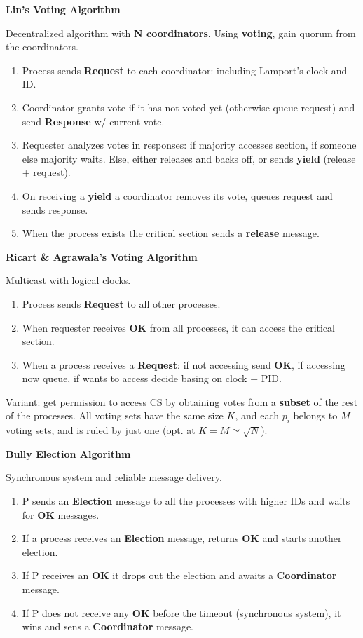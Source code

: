 \documentclass[a4paper, 10pt, twocolumn]{article}
\begin{document}
    \textbf{Lin's Voting Algorithm}
    
    Decentralized algorithm with \textbf{N coordinators}.
    Using \textbf{voting}, gain quorum from the coordinators.
    \begin{enumerate}
        \item Process sends \textbf{Request} to each coordinator: including Lamport's clock and ID.
        \item Coordinator grants vote if it has not voted yet (otherwise queue request) and send \textbf{Response} w/ current vote.
        \item Requester analyzes votes in responses: if majority accesses section, if someone else majority waits. Else, either releases and backs off, or sends \textbf{yield} (release + request).
        \item On receiving a \textbf{yield} a coordinator removes its vote, queues request and sends response.
        \item When the process exists the critical section sends a \textbf{release} message.
    \end{enumerate}

    \textbf{Ricart \& Agrawala's Voting Algorithm}

    Multicast with logical clocks.
    \begin{enumerate}
        \item Process sends \textbf{Request} to all other processes.
        \item When requester receives \textbf{OK} from all processes, it can access the critical section.
        \item When a process receives a \textbf{Request}: if not accessing send \textbf{OK}, if accessing now queue, if wants to access decide basing on clock + PID.
    \end{enumerate}
    Variant: get permission to access CS by obtaining votes from a \textbf{subset} of the rest of the processes.
    All voting sets have the same size $K$, and each $p_i$ belongs to $M$ voting sets, and is ruled by just one (opt. at $K = M \simeq \sqrt{N}$).

    \textbf{Bully Election Algorithm}

    Synchronous system and reliable message delivery.
    \begin{enumerate}
        \item P sends an \textbf{Election} message to all the processes with higher IDs and waits for \textbf{OK} messages.
        \item If a process receives an \textbf{Election} message, returns \textbf{OK} and starts another election.
        \item If P receives an \textbf{OK} it drops out the election and awaits a \textbf{Coordinator} message.
        \item If P does not receive any \textbf{OK} before the timeout (synchronous system), it wins and sens a \textbf{Coordinator} message.
    \end{enumerate}
\end{document}
